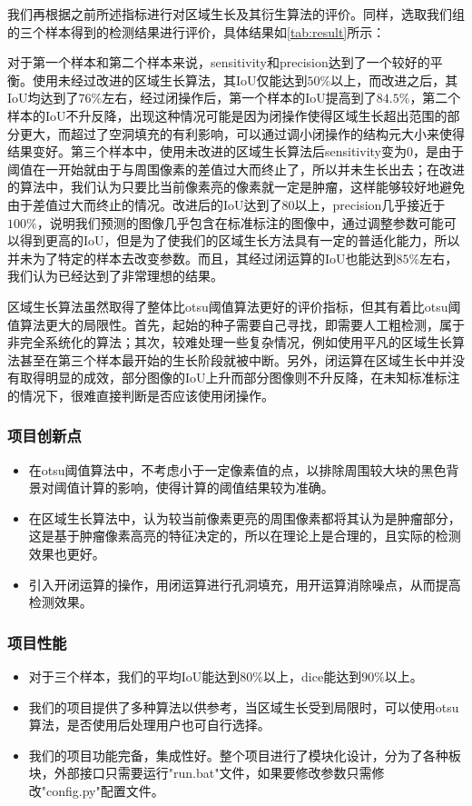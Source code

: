\documentclass[UTF8]{ctexart}
\begin{document}
	我们再根据之前所述指标进行对区域生长及其衍生算法的评价。同样，选取我们组的三个样本得到的检测结果进行评价，具体结果如\ref{tab:result}所示：
	
	对于第一个样本和第二个样本来说，sensitivity和precision达到了一个较好的平衡。使用未经过改进的区域生长算法，其IoU仅能达到$50\%$以上，而改进之后，其IoU均达到了$76\%$左右，经过闭操作后，第一个样本的IoU提高到了$84.5\%$，第二个样本的IoU不升反降，出现这种情况可能是因为闭操作使得区域生长超出范围的部分更大，而超过了空洞填充的有利影响，可以通过调小闭操作的结构元大小来使得结果变好。第三个样本中，使用未改进的区域生长算法后sensitivity变为0，是由于阈值在一开始就由于与周围像素的差值过大而终止了，所以并未生长出去；在改进的算法中，我们认为只要比当前像素亮的像素就一定是肿瘤，这样能够较好地避免由于差值过大而终止的情况。改进后的IoU达到了80以上，precision几乎接近于$100\%$，说明我们预测的图像几乎包含在标准标注的图像中，通过调整参数可能可以得到更高的IoU，但是为了使我们的区域生长方法具有一定的普适化能力，所以并未为了特定的样本去改变参数。而且，其经过闭运算的IoU也能达到$85\%$左右，我们认为已经达到了非常理想的结果。
	
	区域生长算法虽然取得了整体比otsu阈值算法更好的评价指标，但其有着比otsu阈值算法更大的局限性。首先，起始的种子需要自己寻找，即需要人工粗检测，属于非完全系统化的算法；其次，较难处理一些复杂情况，例如使用平凡的区域生长算法甚至在第三个样本最开始的生长阶段就被中断。另外，闭运算在区域生长中并没有取得明显的成效，部分图像的IoU上升而部分图像则不升反降，在未知标准标注的情况下，很难直接判断是否应该使用闭操作。

    \subsubsection{项目创新点}
    \begin{itemize}
        \item 在otsu阈值算法中，不考虑小于一定像素值的点，以排除周围较大块的黑色背景对阈值计算的影响，使得计算的阈值结果较为准确。
        \item 在区域生长算法中，认为较当前像素更亮的周围像素都将其认为是肿瘤部分，这是基于肿瘤像素高亮的特征决定的，所以在理论上是合理的，且实际的检测效果也更好。
        \item 引入开闭运算的操作，用闭运算进行孔洞填充，用开运算消除噪点，从而提高检测效果。
    \end{itemize}
		
    \subsubsection{项目性能}
    \begin{itemize}
        \item 对于三个样本，我们的平均IoU能达到$80\%$以上，dice能达到$90\%$以上。
        \item 我们的项目提供了多种算法以供参考，当区域生长受到局限时，可以使用otsu算法，是否使用后处理用户也可自行选择。
        \item 我们的项目功能完备，集成性好。整个项目进行了模块化设计，分为了各种板块，外部接口只需要运行"run.bat"文件，如果要修改参数只需修改"config.py"配置文件。
    \end{itemize}
	
\end{document}
